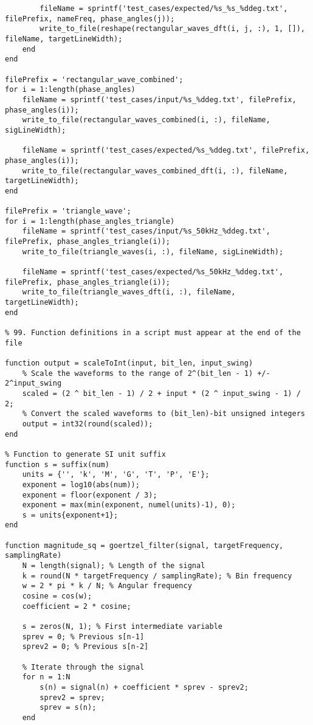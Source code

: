 \begin{lstlisting}
        fileName = sprintf('test_cases/expected/%s_%s_%ddeg.txt', filePrefix, nameFreq, phase_angles(j));
        write_to_file(reshape(rectangular_waves_dft(i, j, :), 1, []), fileName, targetLineWidth);
    end
end

filePrefix = 'rectangular_wave_combined';
for i = 1:length(phase_angles)
    fileName = sprintf('test_cases/input/%s_%ddeg.txt', filePrefix, phase_angles(i));
    write_to_file(rectangular_waves_combined(i, :), fileName, sigLineWidth);

    fileName = sprintf('test_cases/expected/%s_%ddeg.txt', filePrefix, phase_angles(i));
    write_to_file(rectangular_waves_combined_dft(i, :), fileName, targetLineWidth);
end

filePrefix = 'triangle_wave';
for i = 1:length(phase_angles_triangle)
    fileName = sprintf('test_cases/input/%s_50kHz_%ddeg.txt', filePrefix, phase_angles_triangle(i));
    write_to_file(triangle_waves(i, :), fileName, sigLineWidth);

    fileName = sprintf('test_cases/expected/%s_50kHz_%ddeg.txt', filePrefix, phase_angles_triangle(i));
    write_to_file(triangle_waves_dft(i, :), fileName, targetLineWidth);
end

% 99. Function definitions in a script must appear at the end of the file

function output = scaleToInt(input, bit_len, input_swing)
    % Scale the waveforms to the range of 2^(bit_len - 1) +/- 2^input_swing
    scaled = (2 ^ bit_len - 1) / 2 + input * (2 ^ input_swing - 1) / 2;
    % Convert the scaled waveforms to (bit_len)-bit unsigned integers
    output = int32(round(scaled));
end

% Function to generate SI unit suffix
function s = suffix(num)
    units = {'', 'k', 'M', 'G', 'T', 'P', 'E'};
    exponent = log10(abs(num));
    exponent = floor(exponent / 3);
    exponent = max(min(exponent, numel(units)-1), 0);
    s = units{exponent+1};
end

function magnitude_sq = goertzel_filter(signal, targetFrequency, samplingRate)
    N = length(signal); % Length of the signal
    k = round(N * targetFrequency / samplingRate); % Bin frequency
    w = 2 * pi * k / N; % Angular frequency
    cosine = cos(w);
    coefficient = 2 * cosine;

    s = zeros(N, 1); % First intermediate variable
    sprev = 0; % Previous s[n-1]
    sprev2 = 0; % Previous s[n-2]

    % Iterate through the signal
    for n = 1:N
        s(n) = signal(n) + coefficient * sprev - sprev2;
        sprev2 = sprev;
        sprev = s(n);
    end


\end{lstlisting}
